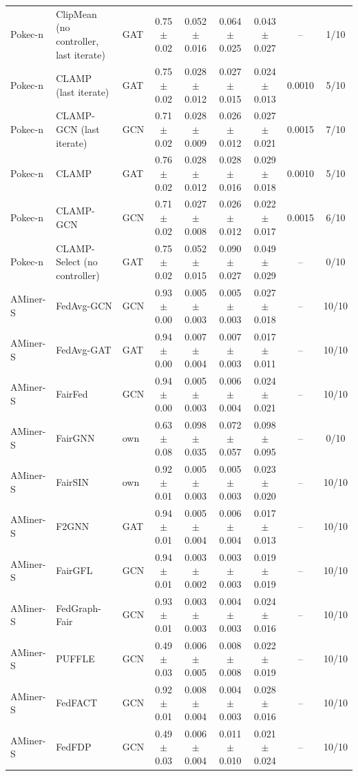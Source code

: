 \begin{longtable}{lp{2.2cm}lcccccc}
Pokec-n & ClipMean (no controller, last iterate) & GAT & 0.75$\pm$0.02 & 0.052$\pm$0.016 & 0.064$\pm$0.025 & 0.043$\pm$0.027 & -- & 1/10 \\
Pokec-n & CLAMP (last iterate) & GAT & 0.75$\pm$0.02 & 0.028$\pm$0.012 & 0.027$\pm$0.015 & 0.024$\pm$0.013 & 0.0010 & 5/10 \\
Pokec-n & CLAMP-GCN (last iterate) & GCN & 0.71$\pm$0.02 & 0.028$\pm$0.009 & 0.026$\pm$0.012 & 0.027$\pm$0.021 & 0.0015 & 7/10 \\
Pokec-n & CLAMP & GAT & 0.76$\pm$0.02 & 0.028$\pm$0.012 & 0.028$\pm$0.016 & 0.029$\pm$0.018 & 0.0010 & 5/10 \\
Pokec-n & CLAMP-GCN & GCN & 0.71$\pm$0.02 & 0.027$\pm$0.008 & 0.026$\pm$0.012 & 0.022$\pm$0.017 & 0.0015 & 6/10 \\
Pokec-n & CLAMP-Select (no controller) & GAT & 0.75$\pm$0.02 & 0.052$\pm$0.015 & 0.090$\pm$0.027 & 0.049$\pm$0.029 & -- & 0/10 \\
AMiner-S & FedAvg-GCN & GCN & 0.93$\pm$0.00 & 0.005$\pm$0.003 & 0.005$\pm$0.003 & 0.027$\pm$0.018 & -- & 10/10 \\
AMiner-S & FedAvg-GAT & GAT & 0.94$\pm$0.00 & 0.007$\pm$0.004 & 0.007$\pm$0.003 & 0.017$\pm$0.011 & -- & 10/10 \\
AMiner-S & FairFed & GCN & 0.94$\pm$0.00 & 0.005$\pm$0.003 & 0.006$\pm$0.004 & 0.024$\pm$0.021 & -- & 10/10 \\
AMiner-S & FairGNN & own & 0.63$\pm$0.08 & 0.098$\pm$0.035 & 0.072$\pm$0.057 & 0.098$\pm$0.095 & -- & 0/10 \\
AMiner-S & FairSIN & own & 0.92$\pm$0.01 & 0.005$\pm$0.003 & 0.005$\pm$0.003 & 0.023$\pm$0.020 & -- & 10/10 \\
AMiner-S & F2GNN & GAT & 0.94$\pm$0.01 & 0.005$\pm$0.004 & 0.006$\pm$0.004 & 0.017$\pm$0.013 & -- & 10/10 \\
AMiner-S & FairGFL & GCN & 0.94$\pm$0.01 & 0.003$\pm$0.002 & 0.003$\pm$0.003 & 0.019$\pm$0.019 & -- & 10/10 \\
AMiner-S & FedGraph-Fair & GCN & 0.93$\pm$0.01 & 0.003$\pm$0.003 & 0.004$\pm$0.003 & 0.024$\pm$0.016 & -- & 10/10 \\
AMiner-S & PUFFLE & GCN & 0.49$\pm$0.03 & 0.006$\pm$0.005 & 0.008$\pm$0.008 & 0.022$\pm$0.019 & -- & 10/10 \\
AMiner-S & FedFACT & GCN & 0.92$\pm$0.01 & 0.008$\pm$0.004 & 0.004$\pm$0.003 & 0.028$\pm$0.016 & -- & 10/10 \\
AMiner-S & FedFDP & GCN & 0.49$\pm$0.03 & 0.006$\pm$0.004 & 0.011$\pm$0.010 & 0.021$\pm$0.024 & -- & 10/10 \\

\end{longtable}
